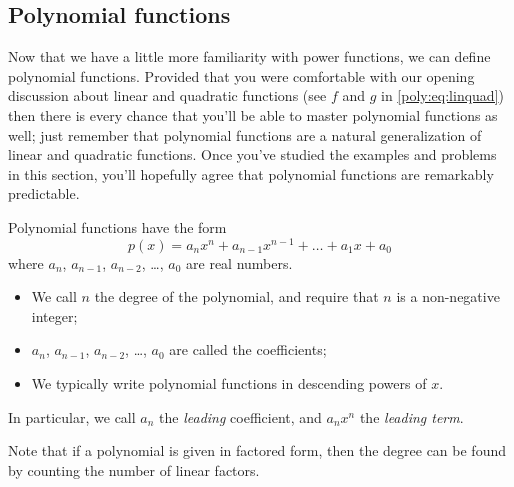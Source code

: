 \subsection*{Polynomial functions}
Now that we have a little more familiarity with power functions, 
we can define polynomial functions. Provided that you were comfortable
with our opening discussion about linear and quadratic functions (see 
$f$ and $g$ in \cref{poly:eq:linquad}) then there is every chance 
that you'll be able to master polynomial functions as well; just remember
that polynomial functions are a natural generalization of linear
and quadratic functions. Once you've studied the examples and problems
in this section, you'll hopefully agree that polynomial functions
are remarkably predictable.

\begin{pccdefinition}
Polynomial functions have the form
\[
	p(x)=a_nx^n+a_{n-1}x^{n-1}+\ldots+a_1x+a_0
\]
where $a_n$, $a_{n-1}$, $a_{n-2}$, \ldots, $a_0$ are real numbers.
\begin{itemize}
	\item We call $n$ the degree of the polynomial, and require that $n$
	is a non-negative integer;
	\item $a_n$, $a_{n-1}$, $a_{n-2}$, \ldots, $a_0$ are called the coefficients;
	\item We typically write polynomial functions in descending powers of $x$.
\end{itemize}
In particular, we call $a_n$ the \emph{leading} coefficient, and $a_nx^n$ the 
\emph{leading term}.

Note that if a polynomial is given in factored form, then the degree can be found 
by counting the number of linear factors.
\end{pccdefinition}

